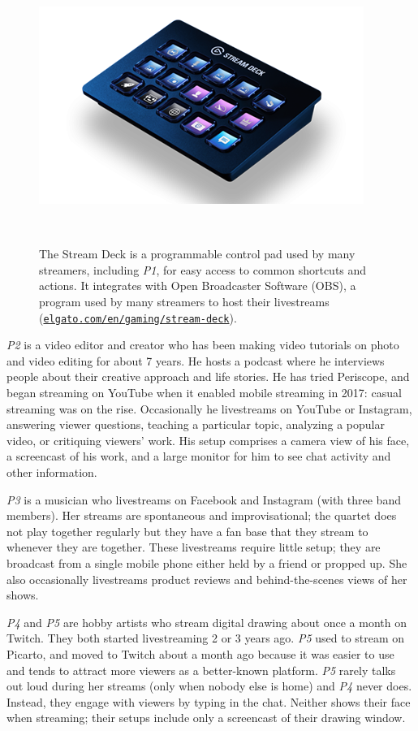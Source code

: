 \begin{figure}[b]
\centering
  \includegraphics[width=0.6\columnwidth]{livestreams/figures/streamdeck.png}
  \caption{The Stream Deck is a programmable control pad used by many streamers, including \textit{P1}, for easy access to common shortcuts and actions. It integrates with Open Broadcaster Software (OBS), a program used by many streamers to host their livestreams (\href{https://www.elgato.com/en/gaming/stream-deck}{\nolinkurl{elgato.com/en/gaming/stream-deck}}).}~\label{fig:livestream_streamdeck}
  \vspace{-0.2in}
\end{figure}

\textit{P2} is a video editor and creator who has been making video tutorials on photo and video editing for about 7 years. He hosts a podcast where he interviews people about their creative approach and life stories. He has tried Periscope, and began streaming on YouTube when it enabled mobile streaming in 2017: casual streaming was on the rise. Occasionally he livestreams on YouTube or Instagram, answering viewer questions, teaching a particular topic, analyzing a popular video, or critiquing viewers' work. His setup comprises a camera view of his face, a screencast of his work, and a large monitor for him to see chat activity and other information.

\textit{P3} is a musician who livestreams on Facebook and Instagram (with three band members). Her streams are spontaneous and improvisational; the quartet does not play together regularly but they have a fan base that they stream to whenever they are together. These livestreams require little setup; they are broadcast from a single mobile phone either held by a friend or propped up. She also occasionally livestreams product reviews and behind-the-scenes views of her shows.

\textit{P4} and \textit{P5} are hobby artists who stream digital drawing about once a month on Twitch. They both started livestreaming 2 or 3 years ago. \textit{P5} used to stream on Picarto, and moved to Twitch about a month ago because it was easier to use and tends to attract more viewers as a better-known platform. \textit{P5} rarely talks out loud during her streams (only when nobody else is home) and \textit{P4} never does. Instead, they engage with viewers by typing in the chat. Neither shows their face when streaming; their setups include only a screencast of their drawing window. 

